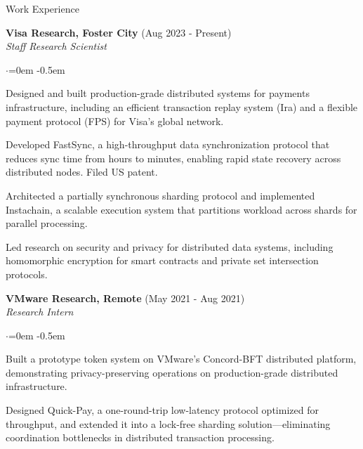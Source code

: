 \documentclass{resume}
\begin{document}
\begin{rSection}{Work Experience}
\label{sec:orgf0a5170}

\textbf{Visa Research, Foster City}  \hfill  (Aug 2023 - Present)\\
\emph{Staff Research Scientist}
\begin{list}{$\cdot$}{\leftmargin=0em}
\itemsep -0.5em \vspace{-0.5em}
 \item  Designed and built production-grade distributed systems for payments infrastructure, including an efficient transaction replay system (Ira) and a flexible payment protocol (FPS) for Visa's global network.
 \item  Developed FastSync, a high-throughput data synchronization protocol that reduces sync time from hours to minutes, enabling rapid state recovery across distributed nodes. Filed US patent.
 \item  Architected a partially synchronous sharding protocol and implemented Instachain, a scalable execution system that partitions workload across shards for parallel processing.
 \item  Led research on security and privacy for distributed data systems, including homomorphic encryption for smart contracts and private set intersection protocols.
\end{list}
\vspace{0.5em}

\textbf{VMware Research, Remote}  \hfill  (May 2021 - Aug 2021)\\
\emph{Research Intern}
\begin{list}{$\cdot$}{\leftmargin=0em}
\itemsep -0.5em \vspace{-0.5em}
 \item  Built a prototype token system on VMware's Concord-BFT distributed platform, demonstrating privacy-preserving operations on production-grade distributed infrastructure.
 \item  Designed Quick-Pay, a one-round-trip low-latency protocol optimized for throughput, and extended it into a lock-free sharding solution---eliminating coordination bottlenecks in distributed transaction processing.
\end{list}
\vspace{0.5em}


\end{rSection}
\end{document}
